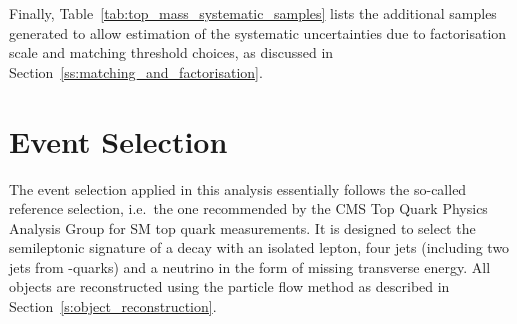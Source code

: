 
Finally, Table~\ref{tab:top_mass_systematic_samples} lists the additional samples generated to allow estimation of the
systematic uncertainties due to factorisation scale and matching threshold choices, as discussed in
Section~\ref{ss:matching_and_factorisation}.







\section{Event Selection}
\label{s_top_mass:event_selection}

The event selection applied in this analysis essentially follows the so-called reference selection, i.e.\ the one
recommended by the CMS Top Quark Physics Analysis Group for SM top quark measurements. It is designed to select the
semileptonic signature of a \ttbar decay with an isolated lepton, four jets (including two jets from \cPqb-quarks) and
a neutrino in the form of missing transverse energy. All objects are reconstructed using the particle flow method as
described in Section~\ref{s:object_reconstruction}.


